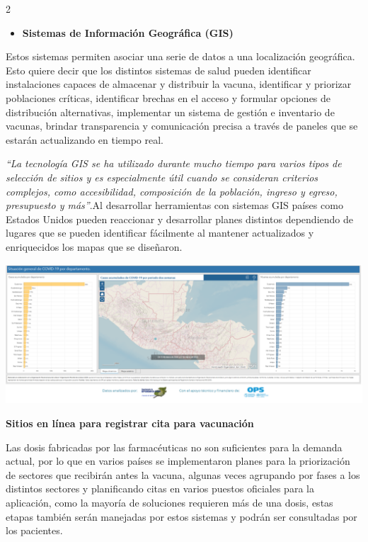 \documentclass[12pt,spanish,Letterpaper,openany]{book}
\providecommand{\tightlist}{%
  \setlength{\itemsep}{0pt}\setlength{\parskip}{0pt}}
\begin{document}
\begin {multicols}{2}
\begin{itemize}
\tightlist
\item
  \textbf{Sistemas de Información Geográfica (GIS)}
\end{itemize}

Estos sistemas permiten asociar una serie de datos a una localización geográfica. Esto quiere
decir que los distintos sistemas de salud pueden identificar instalaciones capaces de
almacenar y distribuir la vacuna, identificar y priorizar poblaciones críticas, identificar
brechas en el acceso y formular opciones de distribución alternativas, implementar un sistema
de gestión e inventario de vacunas, brindar transparencia y comunicación precisa a través de
paneles que se estarán actualizando en tiempo real.

\emph{``La tecnología GIS se ha utilizado durante mucho tiempo para varios tipos de selección de
sitios y es especialmente útil cuando se consideran criterios complejos, como accesibilidad,
composición de la población, ingreso y egreso, presupuesto y más''}.Al desarrollar
herramientas con sistemas GIS países como Estados Unidos pueden reaccionar y desarrollar
planes distintos dependiendo de lugares que se pueden identificar fácilmente al mantener
actualizados y enriquecidos los mapas que se diseñaron.

\begin {flushleft}
\noindent\begin{minipage}[c]{\columnwidth}

\includegraphics[width=1\linewidth]{images/pareja52_01}

\end{minipage}

\end {flushleft}

\textbf{Sitios en línea para registrar cita para vacunación}

Las dosis fabricadas por las farmacéuticas no son suficientes para la demanda actual, por lo
que en varios países se implementaron planes para la priorización de sectores que recibirán
antes la vacuna, algunas veces agrupando por fases a los distintos sectores y planificando
citas en varios puestos oficiales para la aplicación, como la mayoría de soluciones requieren
más de una dosis, estas etapas también serán manejadas por estos sistemas y podrán ser
consultadas por los pacientes.


\end{multicols}
\end{document}
